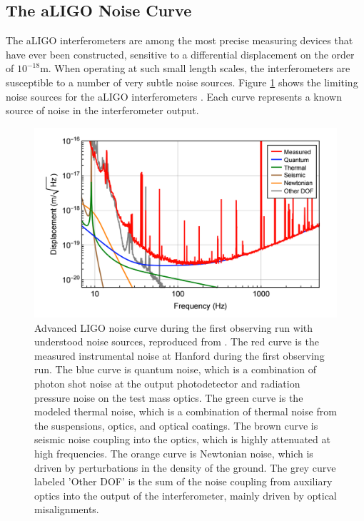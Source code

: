 \subsection{The aLIGO Noise Curve}

The aLIGO interferometers are among the most precise measuring devices 
that have ever been constructed, sensitive to a differential displacement 
on the order of $10^{-18}$m. When operating at such small length scales, 
the interferometers are susceptible to a number of very subtle noise sources. 
Figure \ref{fig:noise-budget} shows the limiting noise sources for the 
aLIGO interferometers \cite{GW150914-DETECTORS}. Each curve represents 
a known source of noise in the interferometer output. 

\begin{figure}[ht!]
\includegraphics[width=\textwidth]{figures/introduction/noise-budget}
\caption[Advanced LIGO noise budget]{Advanced LIGO noise curve during the first %
         observing run with %
         understood noise sources, reproduced from \cite{GW150914-DETECTORS}. %
         The red curve is the measured instrumental noise at Hanford during the first %
         observing run. The blue curve is quantum noise, which is a combination of %
         photon shot noise at the output photodetector and radiation pressure noise %
         on the test mass optics. The green curve is the modeled thermal noise, which is a %
         combination of thermal noise from the suspensions, optics, and optical %
         coatings. The brown curve is seismic noise coupling into the optics, %
         which is highly attenuated at high frequencies. The orange curve is %
         Newtonian noise, which is driven by perturbations in the density of %
         the ground. The grey curve labeled 'Other DOF' is the sum of the %
         noise coupling from auxiliary optics into the output of the interferometer, %
         mainly driven by optical misalignments.
        }
\label{fig:noise-budget}
\end{figure}

